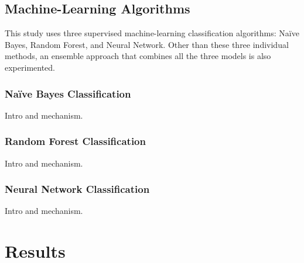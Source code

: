 \documentclass[12pt]{article}
\begin{document}
\subsection{Machine-Learning Algorithms}

This study uses three supervised machine-learning classification algorithms: Na\"ive Bayes, Random Forest, and Neural Network. Other than these three individual methods, an ensemble approach that combines all the three models is also experimented. 

\subsubsection{Na\"ive Bayes Classification}

Intro and mechanism.

\subsubsection{Random Forest Classification}

Intro and mechanism.

\subsubsection{Neural Network Classification}

Intro and mechanism.

\section{Results}




\singlespacing
\printbibliography
\end{document}
